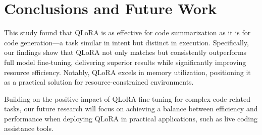 \section{Conclusions and Future Work} 
\label{sec:conclusions}

This study found that QLoRA is as effective for code summarization as it is for code generation---a task similar in intent but distinct in execution. Specifically, our findings show that QLoRA not only matches but consistently outperforms full model fine-tuning, delivering superior results while significantly improving resource efficiency. Notably, QLoRA excels in memory utilization, positioning it as a practical solution for resource-constrained environments.

Building on the positive impact of QLoRA fine-tuning for complex code-related tasks, our future research will focus on achieving a balance between efficiency and performance when deploying QLoRA in practical applications, such as live coding assistance tools.

